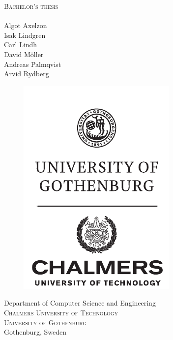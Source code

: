 \newpage
\restoregeometry
\thispagestyle{empty}
\mbox{}

\newpage
\thispagestyle{empty}
\begin{center}
	\textsc{\large Bachelor's thesis \the\year}\\[4cm]		%
	\textbf{\Large \multiLineTitle{0.2cm}} \\[1cm]

	{\large Algot Axelzon}\\[1ex]
	{\large Isak Lindgren}\\[1ex]
    {\large Carl Lindh}\\[1ex]
	{\large David Möller}\\[1ex]
	{\large Andreas Palmqvist}\\[1ex]
	{\large Arvid Rydberg}
	
	\vfill	
	\begin{figure}[H]
	\centering
	\includegraphics[width=0.25\pdfpagewidth]{figures/auxiliary/ChGULogoHog.pdf}
	\end{figure}	\vspace{5mm}	
	
	Department of Computer Science and Engineering\\
	\textsc{Chalmers University of Technology} \\
	\textsc{University of Gothenburg} \\
	Gothenburg, Sweden \the\year \\
\end{center}


